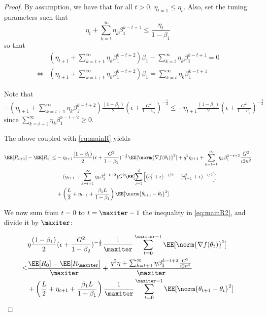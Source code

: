 \documentclass[11pt]{article}
\begin{document}
\begin{proof}
By assumption, we have that for all $t >0$, $\eta_{t=1} \leq \eta_t$.
Also, set the tuning parameters such that
\begin{equation}
 \eta_{t}+ \sum_{k=t}^\infty \eta_{k} \beta_1^{k-t+1} \leq \frac{\eta_t}{1 - \beta_1}
 \end{equation}
 so that 
\begin{equation}
\begin{split}
& (\eta_{t+1} + \sum_{k=t+1}^\infty \eta_{k} \beta_1^{k-t+2}) \beta_1- \sum_{k=t}^\infty \eta_{k} \beta_1^{k-t+1} = 0\\
\iff& (\eta_{t+1} + \sum_{k=t+1}^\infty \eta_{k} \beta_1^{k-t+2}) \beta_1 = \sum_{k=t}^\infty \eta_{k} \beta_1^{k-t+1}
\end{split}
\end{equation}

Note that $- (\eta_{t+1}+ \sum_{k=t+1}^\infty \eta_{k} \beta_1^{k-t+2})\frac{(1-\beta_1)}{2}  (\epsilon + \frac{G^2}{1 - \beta_2})^{-\frac{1}{2}}\leq - \eta_{t+1}\frac{(1-\beta_1)}{2} (\epsilon + \frac{G^2}{1 - \beta_2})^{-\frac{1}{2}}$ since $ \sum_{k=t+1}^\infty \eta_{k} \beta_1^{k-t+2} \geq 0$.

The above coupled with \eqref{eq:mainR} yields

\begin{equation}\label{eq:mainR2}
\begin{split}
\EE[R_{t+1}] - \EE[R_t] \leq & - \eta_{t+1}\frac{(1-\beta_1)}{2} (\epsilon + \frac{G^2}{1 - \beta_2})^{-\frac{1}{2}} \EE[\norm{\nabla f(\theta_t)}^2]+q^2 \eta_{t+1}+ \sum_{k=t+1}^\infty \eta_{k} \beta_1^{k-t+2}\frac{G^2 }{\epsilon 2n^2}\\
&  -  (\eta_{t+1}+ \sum_{k=t+1}^\infty \eta_{k} \beta_1^{k-t+2}) G^2 \EE[\sum_{j=1}^d \left[(\hat{v}^j_{t} + \epsilon )^{-1/2} - (\hat{v}^j_{t+1} + \epsilon )^{-1/2}  \right] ]\\
& + \left(\frac{L}{2} + \eta_{t+1}+ \frac{\beta_1L}{1-\beta_1} \right)  \EE[ \norm{\theta_{t+1} - \theta_{t}}^2]
\end{split}
\end{equation}

We now sum from $t = 0$ to $t = \maxiter -1$  the inequality in \eqref{eq:mainR2}, and divide it by $\maxiter$:

\begin{equation}\label{eq:finalR2}
\begin{split}
&\eta\frac{(1-\beta_1)}{2} (\epsilon + \frac{G^2}{1 - \beta_2})^{-\frac{1}{2}} \frac{1}{\maxiter}\sum_{t=0}^{\maxiter -1} \EE[\norm{\nabla f(\theta_t)}^2] \\
\leq & \frac{\EE[R_0] - \EE[R_{\maxiter}]}{\maxiter} + \frac{q^2 \eta+ \sum_{k=t+1}^\infty \eta \beta_1^{k-t+2}\frac{G^2 }{\epsilon 2n^2}}{\maxiter}\\
& + \left(\frac{L}{2} + \eta_{t+1}+ \frac{\beta_1L}{1-\beta_1} \right)\frac{1}{\maxiter}  \sum_{t=0}^{\maxiter -1}\EE[ \norm{\theta_{t+1} - \theta_{t}}^2]
\end{split}
\end{equation}


\end{proof}
\end{document}
